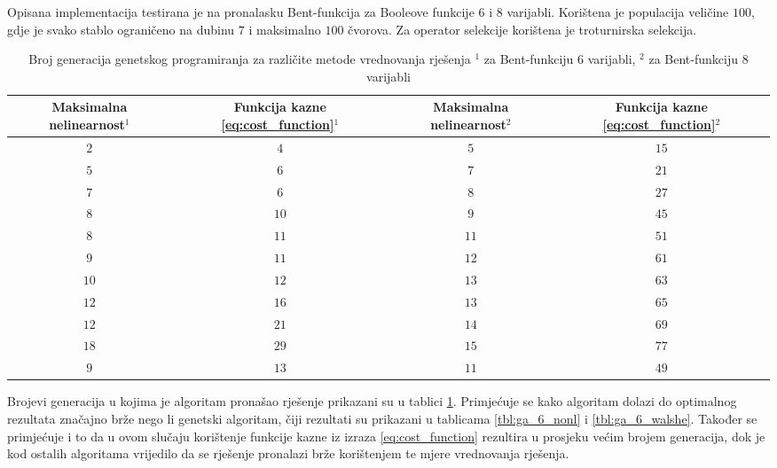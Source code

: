 Opisana implementacija testirana je na pronalasku Bent-funkcija za Booleove funkcije $6$ i $8$ varijabli.
Korištena je populacija veličine $100$, gdje je svako stablo ograničeno na dubinu $7$ i maksimalno $100$ čvorova.
Za operator selekcije korištena je troturnirska selekcija.
\begin{table}[]
    \centering
    \captionsetup{justification=centering}
    \caption{Broj generacija genetskog programiranja za različite metode vrednovanja rješenja \newline
    \footnotesize{$^1$ za Bent-funkciju $6$ varijabli, $^2$ za Bent-funkciju $8$ varijabli}}
    \begin{tabular}{cccc} \hline
        \makecell{Maksimalna \\ nelinearnost$^1$} & \makecell{Funkcija \\ kazne \eqref{eq:cost_function}$^1$} & \makecell{Maksimalna \\ nelinearnost$^2$} & \makecell{Funkcija \\ kazne \eqref{eq:cost_function}$^2$} \\ \hline
         $2$ &  $4$ &  $5$ & $15$ \\
         $5$ &  $6$ &  $7$ & $21$ \\
         $7$ &  $6$ &  $8$ & $27$ \\
         $8$ & $10$ &  $9$ & $45$ \\
         $8$ & $11$ & $11$ & $51$ \\
         $9$ & $11$ & $12$ & $61$ \\
        $10$ & $12$ & $13$ & $63$ \\
        $12$ & $16$ & $13$ & $65$ \\
        $12$ & $21$ & $14$ & $69$ \\
        $18$ & $29$ & $15$ & $77$ \\ \hline
         $9$ & $13$ & $11$ & $49$
    \end{tabular}
    \label{tbl:gp_6_8}
\end{table}
Brojevi generacija u kojima je algoritam pronašao rješenje prikazani su u tablici \ref{tbl:gp_6_8}.
Primjećuje se kako algoritam dolazi do optimalnog rezultata značajno brže nego li genetski algoritam, čiji rezultati su prikazani u tablicama \ref{tbl:ga_6_nonl} i \ref{tbl:ga_6_walshe}.
Također se primjećuje i to da u ovom slučaju korištenje funkcije kazne iz izraza \eqref{eq:cost_function} rezultira u prosjeku većim brojem generacija, dok je kod ostalih algoritama vrijedilo da se rješenje pronalazi brže korištenjem te mjere vrednovanja rješenja.

